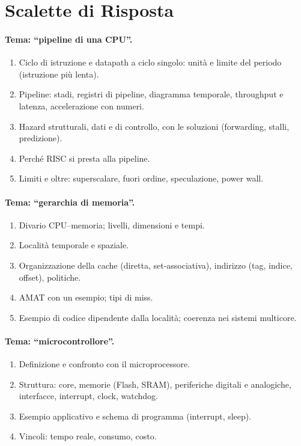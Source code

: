 \section{Scalette di Risposta}

\paragraph{Tema: ``pipeline di una CPU''.}
\begin{enumerate}
    \item Ciclo di istruzione e datapath a ciclo singolo: unità e limite del periodo (istruzione più lenta).
    \item Pipeline: stadi, registri di pipeline, diagramma temporale, throughput e latenza, accelerazione con numeri.
    \item Hazard strutturali, dati e di controllo, con le soluzioni (forwarding, stalli, predizione).
    \item Perché RISC si presta alla pipeline.
    \item Limiti e oltre: superscalare, fuori ordine, speculazione, power wall.
\end{enumerate}

\paragraph{Tema: ``gerarchia di memoria''.}
\begin{enumerate}
    \item Divario CPU--memoria; livelli, dimensioni e tempi.
    \item Località temporale e spaziale.
    \item Organizzazione della cache (diretta, set-associativa), indirizzo (tag, indice, offset), politiche.
    \item AMAT con un esempio; tipi di miss.
    \item Esempio di codice dipendente dalla località; coerenza nei sistemi multicore.
\end{enumerate}

\paragraph{Tema: ``microcontrollore''.}
\begin{enumerate}
    \item Definizione e confronto con il microprocessore.
    \item Struttura: core, memorie (Flash, SRAM), periferiche digitali e analogiche, interfacce, interrupt, clock, watchdog.
    \item Esempio applicativo e schema di programma (interrupt, sleep).
    \item Vincoli: tempo reale, consumo, costo.
\end{enumerate}
